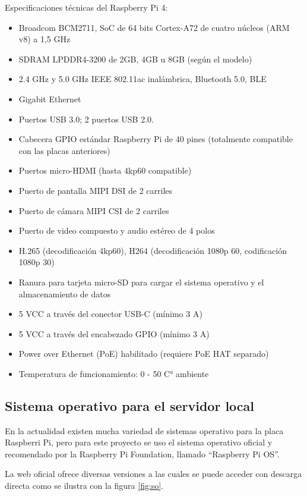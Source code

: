 
Especificaciones técnicas del Raspberry Pi 4:

\begin{itemize}
\item Broadcom BCM2711, SoC de 64 bits Cortex-A72 de cuatro núcleos (ARM v8) a 1,5 GHz
\item SDRAM LPDDR4-3200 de 2GB, 4GB u 8GB (según el modelo)
\item 2.4 GHz y 5.0 GHz IEEE 802.11ac inalámbrica, Bluetooth 5.0, BLE
\item Gigabit Ethernet
\item Puertos USB 3.0; 2 puertos USB 2.0.
\item Cabecera GPIO estándar Raspberry Pi de 40 pines (totalmente compatible con las placas anteriores)
\item Puertos micro-HDMI (hasta 4kp60 compatible)
\item Puerto de pantalla MIPI DSI de 2 carriles
\item Puerto de cámara MIPI CSI de 2 carriles
\item Puerto de video compuesto y audio estéreo de 4 polos
\item H.265 (decodificación 4kp60), H264 (decodificación 1080p 60, codificación 1080p 30)
\item Ranura para tarjeta micro-SD para cargar el sistema operativo y el almacenamiento de datos
\item 5 VCC a través del conector USB-C (mínimo 3 A)
\item 5 VCC a través del encabezado GPIO (mínimo 3 A)
\item Power over Ethernet (PoE) habilitado (requiere PoE HAT separado)
\item Temperatura de funcionamiento: 0 - 50 C° ambiente
\end{itemize}

\subsection{Sistema operativo para el servidor local}

En la actualidad existen mucha variedad de sistemas operativo para la placa Raspberri Pi, pero para este proyecto se uso el sistema operativo oficial y recomendado por la Raspberry Pi Foundation, llamado ``Raspberry Pi OS''.

La web oficial ofrece diversas versiones a las cuales se puede acceder con descarga directa como se ilustra con la figura \ref{fig:so}.

